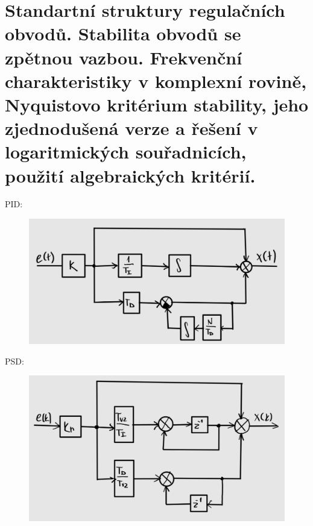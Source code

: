 \section{Standartní struktury regulačních obvodů. Stabilita obvodů se zpětnou vazbou. Frekvenční charakteristiky v komplexní rovině, Nyquistovo kritérium stability, jeho zjednodušená verze a řešení v logaritmických souřadnicích, použití algebraických kritérií.}
PID:
\begin{figure}[H]
    \includegraphics*[scale = 0.6]{images/PIDschema.png}
\end{figure}


PSD:
\begin{figure}[H]
    \includegraphics*[scale = 0.6]{images/PSDschema.png}
\end{figure}
\newpage

